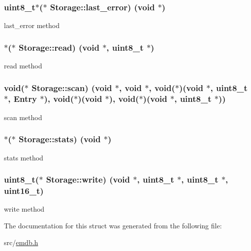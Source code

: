 \subsubsection[{last\+\_\+error}]{\setlength{\rightskip}{0pt plus 5cm}uint8\+\_\+t$\ast$($\ast$ Storage\+::last\+\_\+error) (void $\ast$)}\label{struct_storage_a8d06a225bc4d31d734cab75608fa3cf3}
last\+\_\+error method \hypertarget{struct_storage_a06f9fdcde49a3bbae624b5f673d5798a}{}
\subsubsection[{read}]{$\ast$($\ast$ Storage\+::read) (void $\ast$, uint8\+\_\+t $\ast$)}\label{struct_storage_a06f9fdcde49a3bbae624b5f673d5798a}
read method \hypertarget{struct_storage_a5e24b45fef757acae34cca3bb8464935}{}
\subsubsection[{scan}]{\setlength{\rightskip}{0pt plus 5cm}void($\ast$ Storage\+::scan) (void $\ast$, void $\ast$, void($\ast$)(void $\ast$, uint8\+\_\+t $\ast$, {\bf Entry} $\ast$), void($\ast$)(void $\ast$), void($\ast$)(void $\ast$, uint8\+\_\+t $\ast$))}\label{struct_storage_a5e24b45fef757acae34cca3bb8464935}
scan method \hypertarget{struct_storage_a6642751e068c1e64f8b65703a8bc51a0}{}
\subsubsection[{stats}]{$\ast$($\ast$ Storage\+::stats) (void $\ast$)}\label{struct_storage_a6642751e068c1e64f8b65703a8bc51a0}
stats method \hypertarget{struct_storage_a1024d08a7a0b30fb2d9a492a672d9f05}{}
\subsubsection[{write}]{\setlength{\rightskip}{0pt plus 5cm}uint8\+\_\+t($\ast$ Storage\+::write) (void $\ast$, uint8\+\_\+t $\ast$, uint8\+\_\+t $\ast$, uint16\+\_\+t)}\label{struct_storage_a1024d08a7a0b30fb2d9a492a672d9f05}
write method 

The documentation for this struct was generated from the following file\+:\begin{DoxyCompactItemize}
\item 
src/\hyperlink{emdb_8h}{emdb.\+h}\end{DoxyCompactItemize}
